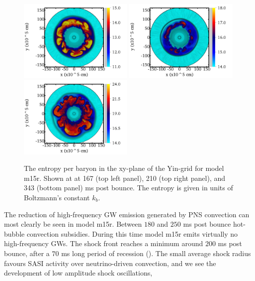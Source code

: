 \begin{figure}[ht]         
\centering                            
\includegraphics[width=0.49\textwidth]{./images/paper2/1.png}
\includegraphics[width=0.49\textwidth]{./images/paper2/2.png} \\
\includegraphics[width=0.49\textwidth]{./images/paper2/3.png}
\caption{The entropy per baryon in the xy-plane of the Yin-grid for model m15r. Shown at
at 167 (top left panel), 210 (top right panel), and 343 (bottom panel) ms post bounce. 
The entropy is given in units of Boltzmann's constant $k_b$. \label{figp2:sto}}
\end{figure}
The reduction of high-frequency GW emission generated by PNS convection can most clearly be seen in model
m15r. Between $180$ and $250$ ms post bounce hot-bubble convection subsidies. During this time
model m15r emits virtually no high-frequency GWs. 
The shock front reaches a minimum around $200$ ms post bounce, after
a $70$ ms long period of recession (). The small average shock radius favours SASI activity over
neutrino-driven convection, and we see the development of low amplitude shock oscillations,
